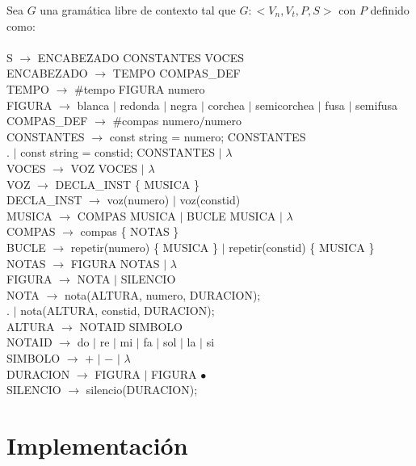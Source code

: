 Sea $G$ una gramática libre de contexto tal que $G: <V_n, V_t, P, S>$ con $P$ definido como: \\
\\  
S $\rightarrow$ ENCABEZADO CONSTANTES VOCES \\
ENCABEZADO $\rightarrow$ TEMPO COMPAS\_DEF \\
TEMPO $\rightarrow$ \#tempo FIGURA numero \\
FIGURA $\rightarrow$ blanca $\mid$ redonda $\mid$ negra $\mid$ corchea $\mid$ semicorchea $\mid$ fusa $\mid$ semifusa \\
COMPAS\_DEF $\rightarrow$ \#compas numero$/$numero  \\
CONSTANTES $\rightarrow$ const string = numero; CONSTANTES \\
.\hspace{2.5cm} $\mid$ const string = constid; CONSTANTES $\mid$ $\lambda$ \\
VOCES $\rightarrow$ VOZ VOCES $\mid$ $\lambda$ \\
VOZ $\rightarrow$ DECLA\_INST \{ MUSICA \} \\
DECLA\_INST $\rightarrow$ voz(numero) $\mid$ voz(constid) \\
MUSICA $\rightarrow$ COMPAS MUSICA $\mid$ BUCLE MUSICA $\mid$ $\lambda$ \\
COMPAS $\rightarrow$ compas \{ NOTAS \} \\
BUCLE $\rightarrow$ repetir(numero) \{ MUSICA \} $\mid$ repetir(constid) \{ MUSICA \} \\
NOTAS $\rightarrow$ FIGURA NOTAS $\mid$ $\lambda$ \\
FIGURA $\rightarrow$ NOTA $\mid$ SILENCIO \\
NOTA $\rightarrow$ nota(ALTURA, numero, DURACION); \\
.\hspace{2.5cm} $\mid$ nota(ALTURA, constid, DURACION); \\
ALTURA $\rightarrow$ NOTAID SIMBOLO \\
NOTAID $\rightarrow$ do $\mid$ re $\mid$ mi $\mid$ fa $\mid$ sol $\mid$ la $\mid$ si \\
SIMBOLO $\rightarrow$ $+$ $\mid$ $-$ $\mid$ $\lambda$ \\
DURACION $\rightarrow$ FIGURA $\mid$ FIGURA $\bullet$ \\
SILENCIO $\rightarrow$ silencio(DURACION); \\

\normalsize

\section{Implementación}

